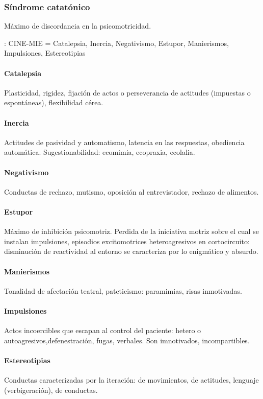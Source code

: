 \subsubsection*{Síndrome catatónico}
Máximo de discordancia en la psicomotricidad.

\faLightbulb: CINE-MIE = Catalepsia, Inercia, Negativismo, Estupor, Manierismos, Impulsiones, Estereotipias

\paragraph*{Catalepsia}
Plasticidad, rigidez, fijación de actos o perseverancia de actitudes (impuestas o espontáneas), flexibilidad cérea.
\paragraph*{Inercia}
Actitudes de pasividad y automatismo, latencia en las respuestas, obediencia automática. Sugestionabilidad: ecomimia, ecopraxia, ecolalia.
\paragraph*{Negativismo}
Conductas de rechazo, mutismo, oposición al entrevistador, rechazo de alimentos.
\paragraph*{Estupor}
Máximo de inhibición psicomotriz. Perdida de la iniciativa motriz sobre el cual se instalan impulsiones, episodios excitomotrices heteroagresivos en cortocircuito: disminución de reactividad al entorno se caracteriza por lo enigmático y absurdo.
\paragraph*{Manierismos}
Tonalidad de afectación teatral, pateticismo: paramimias, risas inmotivadas.
\paragraph*{Impulsiones}
Actos incoercibles que escapan al control del paciente: hetero o autoagresivos,defenestración, fugas, verbales. Son imnotivados, incompartibles.
\paragraph*{Estereotipias}
Conductas caracterizadas por la iteración: de movimientos, de actitudes, lenguaje (verbigeración), de conductas.
